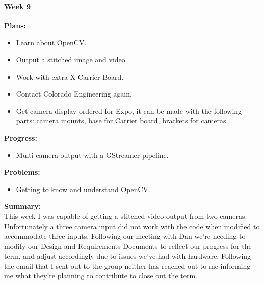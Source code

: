\paragraph{Week 9}
\begin{adjustwidth}{2.5em}{0pt}
    \vspace{-0.5cm}\textbf{Plans:}
    \vspace{-0.5cm}
    \begin{itemize}
        \item Learn about OpenCV.
		\item Output a stitched image and video.
		\item Work with extra X-Carrier Board.
		\item Contact Colorado Engineering again.
		\item Get camera display ordered for Expo, it can be made with the following parts: camera mounts, base for Carrier board, brackets for cameras.
    \end{itemize} 
    \vspace{-0.3cm}\textbf{Progress:}
    \vspace{-0.5cm}
    \begin{itemize}
        \item Multi-camera output with a GStreamer pipeline.
    \end{itemize} 
    \vspace{-0.3cm}\textbf{Problems:}
    \vspace{-0.5cm}
    \begin{itemize}
        \item Getting to know and understand OpenCV.
    \end{itemize}  
    \vspace{-0.3cm}\noindent\textbf{Summary:}\\
    \noindent This week I was capable of getting a stitched video output from two cameras. Unfortunately a three camera input did not work with the code when modified to accommodate three inputs. Following our meeting with Dan we're needing to modify our Design and Requirements Documents to reflect our progress for the term, and adjust accordingly due to issues we've had with hardware. Following the email that I sent out to the group neither has reached out to me informing me what they're planning to contribute to close out the term. 
\end{adjustwidth} 

